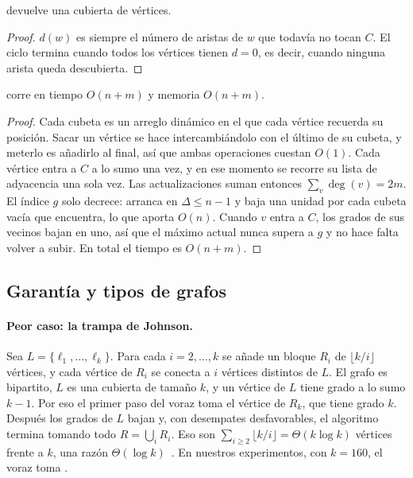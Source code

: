 \begin{proposition}[Corrección]
 devuelve una cubierta de vértices.
\end{proposition}
\begin{proof}
$d(w)$ es siempre el número de aristas de $w$ que todavía no tocan $C$. El ciclo termina cuando todos los vértices tienen $d=0$, es decir, cuando ninguna arista queda descubierta.
\end{proof}

\begin{theorem}[Complejidad]\label{thm:voraz}
 corre en tiempo $O(n+m)$ y memoria $O(n+m)$.
\end{theorem}
\begin{proof}
Cada cubeta es un arreglo dinámico en el que cada vértice recuerda su posición. Sacar un vértice se hace intercambiándolo con el último de su cubeta, y meterlo es añadirlo al final, así que ambas operaciones cuestan $O(1)$. Cada vértice entra a $C$ a lo sumo una vez, y en ese momento se recorre su lista de adyacencia una sola vez. Las actualizaciones suman entonces $\sum_v\deg(v)=2m$. El índice $g$ solo decrece: arranca en $\Delta\le n-1$ y baja una unidad por cada cubeta vacía que encuentra, lo que aporta $O(n)$. Cuando $v$ entra a $C$, los grados de sus vecinos bajan en uno, así que el máximo actual nunca supera a $g$ y no hace falta volver a subir. En total el tiempo es $O(n+m)$.
\end{proof}

\subsection{Garantía y tipos de grafos}
\paragraph{Peor caso: la trampa de Johnson.} Sea $L=\{\ell_1,\dots,\ell_k\}$. Para cada $i=2,\dots,k$ se añade un bloque $R_i$ de $\lfloor k/i\rfloor$ vértices, y cada vértice de $R_i$ se conecta a $i$ vértices distintos de $L$. El grafo es bipartito, $L$ es una cubierta de tamaño $k$, y un vértice de $L$ tiene grado a lo sumo $k-1$. Por eso el primer paso del voraz toma el vértice de $R_k$, que tiene grado $k$. Después los grados de $L$ bajan y, con desempates desfavorables, el algoritmo termina tomando todo $R=\bigcup_iR_i$. Eso son $\sum_{i\ge 2}\lfloor k/i\rfloor=\Theta(k\log k)$ vértices frente a $k$, una razón $\Theta(\log k)$~\citep{johnson1974}. En nuestros experimentos, con $k=160$, el voraz toma .

